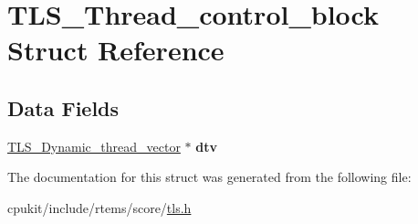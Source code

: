 \hypertarget{structTLS__Thread__control__block}{}\section{T\+L\+S\+\_\+\+Thread\+\_\+control\+\_\+block Struct Reference}
\label{structTLS__Thread__control__block}
\subsection*{Data Fields}
\begin{DoxyCompactItemize}
\item 
\mbox{\label{structTLS__Thread__control__block_af670ffa36b930cd913a1c3874c67db8a}} 
\mbox{\hyperlink{structTLS__Dynamic__thread__vector}{T\+L\+S\+\_\+\+Dynamic\+\_\+thread\+\_\+vector}} $\ast$ {\bfseries dtv}
\end{DoxyCompactItemize}


The documentation for this struct was generated from the following file\+:\begin{DoxyCompactItemize}
\item 
cpukit/include/rtems/score/\mbox{\hyperlink{tls_8h}{tls.\+h}}\end{DoxyCompactItemize}
